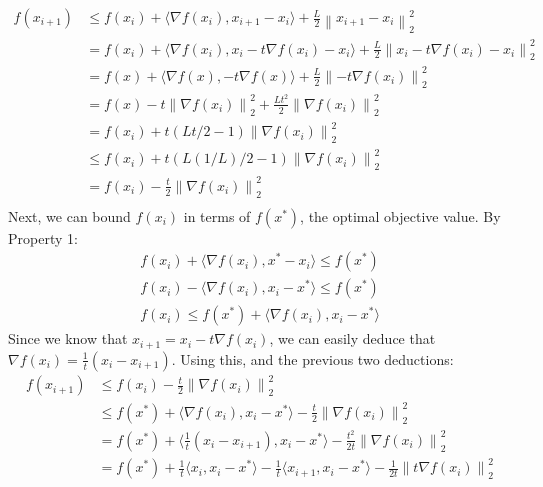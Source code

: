 \documentclass[11pt]{article}
\newcommand{\norm}[1]{\left\lVert#1\right\rVert}
\begin{document}
\begin{enumerate}
\begin{equation}
    \begin{split}
    f(x_{i+1}) & \leq  f(x_{i}) + \langle\nabla f(x_{i}), x_{i+1}-x_{i}\rangle + \frac{L}{2}\norm{x_{i+1}-x_{i}}_2^2 \\
    & = f(x_{i}) + \langle\nabla f(x_{i}), x_{i} - t\nabla f(x_{i})-x_{i}\rangle + \frac{L}{2}\norm{x_{i} - t\nabla f(x_{i})-x_{i}}_2^2 \\
    & = f(x) + \langle\nabla f(x), -t\nabla f(x)\rangle + \frac{L}{2}\norm{- t\nabla f(x_{i})}_2^2 \\
    & = f(x) - t\norm{\nabla f(x_{i})}_2^2 +  \frac{Lt^2}{2}\norm{\nabla f(x_{i})}_2^2 \\
    & = f(x_{i}) + t(Lt/2 - 1)\norm{\nabla f(x_{i})}_2^2 \\
    & \leq f(x_{i}) + t(L(1/L)/2 - 1)\norm{\nabla f(x_{i})}_2^2 \\
    & = f(x_{i}) - \frac{t}{2}\norm{\nabla f(x_{i})}_2^2 \\
    \end{split}
    \end{equation}
    \newline Next, we can bound $f(x_{i})$ in terms of $f(x^{*})$, the optimal objective value. By Property 1: 
    \begin{equation}
    \begin{split}
    f(x_{i}) + \langle\nabla f(x_{i}), x^*-x_{i}\rangle \leq f(x^*)\\
    f(x_{i}) - \langle\nabla f(x_{i}), x_{i} - x^*\rangle \leq f(x^*) \\ 
    f(x_{i}) \leq f(x^*) + \langle\nabla f(x_{i}), x_{i} - x^*\rangle
    \end{split}
    \end{equation}
    \newline Since we know that $x_{i+1} = x_{i} - t\nabla f(x_i)$, we can easily deduce that $\nabla f(x_i) = \frac{1}{t}(x_{i} - x_{i+1})$. Using this, and the previous two deductions: 
    \begin{equation}
    \begin{split}
    f(x_{i+1}) & \leq f(x_{i}) - \frac{t}{2}\norm{\nabla f(x_{i})}_2^2 \\
    & \leq f(x^{*}) + \langle\nabla f(x_{i}), x_{i} - x^*\rangle - \frac{t}{2}\norm{\nabla f(x_{i})}_2^2 \\
    & = f(x^{*}) + \langle \frac{1}{t}(x_i - x_{i+1}), x_i - x^{*}\rangle - \frac{t^2}{2t}\norm{\nabla f(x_{i})}_2^2 \\
    & = f(x^{*}) + \frac{1}{t}\langle x_{i}, x_{i} - x^{*}\rangle - \frac{1}{t}\langle x_{i+1}, x_{i} - x^{*}\rangle - \frac{1}{2t}\norm{t\nabla f(x_{i})}_2^2 \\

\end{split}
\end{equation}
\end{enumerate}
\end{document}
